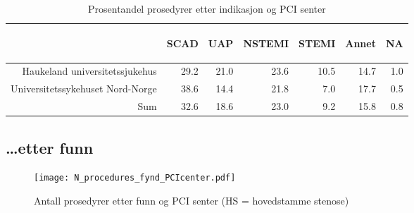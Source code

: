 \documentclass[norsk, a4paper]{report}
\begin{document}
\begin{tiny}
\begin{table}[ht]
\centering
\begin{tabular}{rrrrrrr}
  \toprule
 & \begin{sideways} SCAD \end{sideways} & \begin{sideways} UAP \end{sideways} & \begin{sideways} NSTEMI \end{sideways} & \begin{sideways} STEMI \end{sideways} & \begin{sideways} Annet \end{sideways} & \begin{sideways} NA \end{sideways} \\ 
  \midrule
Haukeland universitetssjukehus & 29.2 & 21.0 & 23.6 & 10.5 & 14.7 & 1.0 \\ 
  Universitetssykehuset Nord-Norge & 38.6 & 14.4 & 21.8 & 7.0 & 17.7 & 0.5 \\ 
  Sum & 32.6 & 18.6 & 23.0 & 9.2 & 15.8 & 0.8 \\ 
   \bottomrule
\end{tabular}
\caption{Prosentandel prosedyrer etter indikasjon og PCI senter} 
\label{tab:pros:ind}
\end{table}\end{tiny}



\clearpage
\subsection{\ldots etter funn}


\begin{figure}[ht]
  \centering
\texttt{[image: N\_procedures\_fynd\_PCIcenter.pdf]}  \caption{Antall prosedyrer etter funn og PCI senter (HS = hovedstamme stenose)}
\end{figure}
\end{document}
